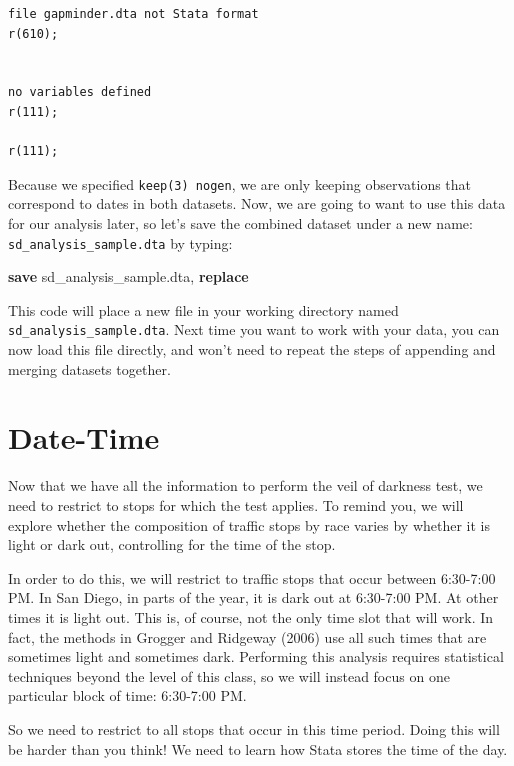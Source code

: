 \documentclass[
]{book}
\newenvironment{Shaded}{\begin{snugshade}}{\end{snugshade}}
\newcommand{\KeywordTok}[1]{\textcolor[rgb]{0.13,0.29,0.53}{\textbf{#1}}}
\newcommand{\NormalTok}[1]{#1}
\begin{document}
\begin{verbatim}
file gapminder.dta not Stata format
r(610);


no variables defined
r(111);

r(111);
\end{verbatim}

Because we specified \texttt{keep(3)\ nogen}, we are only keeping observations that correspond to dates in both datasets. Now, we are going to want to use this data for our analysis later, so let's save the combined dataset under a new name: \texttt{sd\_analysis\_sample.dta} by typing:

\begin{Shaded}
\begin{Highlighting}[]
\KeywordTok{save}\NormalTok{ sd\_analysis\_sample.dta, }\KeywordTok{replace} 
\end{Highlighting}
\end{Shaded}

This code will place a new file in your working directory named \texttt{sd\_analysis\_sample.dta}. Next time you want to work with your data, you can now load this file directly, and won't need to repeat the steps of appending and merging datasets together.

\section{Date-Time}\label{date-time}

Now that we have all the information to perform the veil of darkness test, we need to restrict to stops for which the test applies. To remind you, we will explore whether the composition of traffic stops by race varies by whether it is light or dark out, controlling for the time of the stop.

In order to do this, we will restrict to traffic stops that occur between 6:30-7:00 PM. In San Diego, in parts of the year, it is dark out at 6:30-7:00 PM. At other times it is light out. This is, of course, not the only time slot that will work. In fact, the methods in Grogger and Ridgeway (2006) use all such times that are sometimes light and sometimes dark. Performing this analysis requires statistical techniques beyond the level of this class, so we will instead focus on one particular block of time: 6:30-7:00 PM.

So we need to restrict to all stops that occur in this time period. Doing this will be harder than you think! We need to learn how Stata stores the time of the day.
\end{document}
